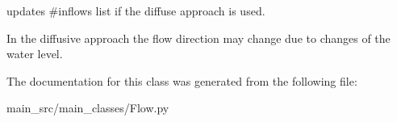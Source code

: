 updates \#inflows list if the diffuse approach is used. 

In the diffusive approach the flow direction may change due to changes of the water level. 

The documentation for this class was generated from the following file\-:\begin{DoxyCompactItemize}
\item 
main\-\_\-src/main\-\_\-classes/Flow.\-py\end{DoxyCompactItemize}
